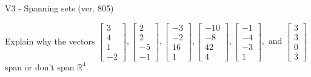 \begin{exercise}
  \begin{exerciseTitle}V3 - Spanning sets (ver. 805)\end{exerciseTitle}
  \begin{exerciseStatement}
    Explain why the vectors \(\left[\begin{array}{r}
3 \\
4 \\
1 \\
-2
\end{array}\right] , \left[\begin{array}{r}
2 \\
2 \\
-5 \\
-1
\end{array}\right] , \left[\begin{array}{r}
-3 \\
-2 \\
16 \\
1
\end{array}\right] , \left[\begin{array}{r}
-10 \\
-8 \\
42 \\
4
\end{array}\right] , \left[\begin{array}{r}
-1 \\
-4 \\
-3 \\
1
\end{array}\right] , \text{ and } \left[\begin{array}{r}
3 \\
3 \\
0 \\
3
\end{array}\right]\) span or don't span \(\mathbb{R}^4\). 
	



\end{exerciseStatement}
\end{exercise}
